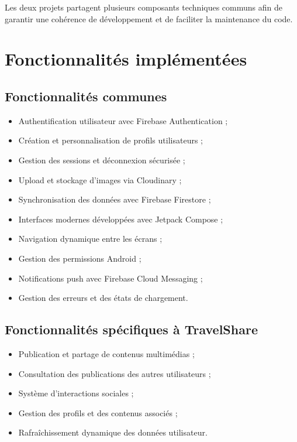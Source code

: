 \documentclass[a4paper, 12pt]{article}
\begin{document}
\begin{justify}
Les deux projets partagent plusieurs composants techniques communs afin de garantir une cohérence de développement et de faciliter la maintenance du code.

\section*{Fonctionnalités implémentées}

\subsection*{Fonctionnalités communes}

\begin{itemize}
    \item Authentification utilisateur avec Firebase Authentication ;
    \item Création et personnalisation de profils utilisateurs ;
    \item Gestion des sessions et déconnexion sécurisée ;
    \item Upload et stockage d'images via Cloudinary ;
    \item Synchronisation des données avec Firebase Firestore ;
    \item Interfaces modernes développées avec Jetpack Compose ;
    \item Navigation dynamique entre les écrans ;
    \item Gestion des permissions Android ;
    \item Notifications push avec Firebase Cloud Messaging ;
    \item Gestion des erreurs et des états de chargement.
\end{itemize}

\subsection*{Fonctionnalités spécifiques à TravelShare}

\begin{itemize}
    \item Publication et partage de contenus multimédias ;
    \item Consultation des publications des autres utilisateurs ;
    \item Système d'interactions sociales ;
    \item Gestion des profils et des contenus associés ;
    \item Rafraîchissement dynamique des données utilisateur.
\end{itemize}


\end{justify}
\end{document}
